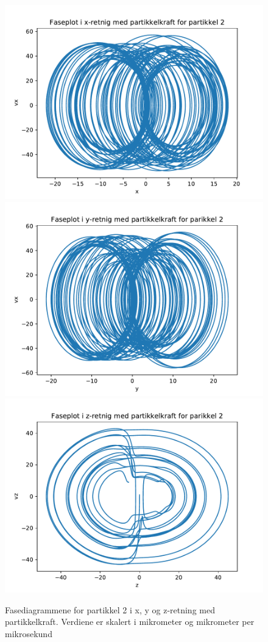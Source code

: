 \documentclass[reprint,english,notitlepage, nofootinbib]{revtex4-1}  %
\begin{document}
\begin{figure}[H]
	\centering 
	\includegraphics[scale=0.4]{../pythonplots/xint2.pdf}
	\includegraphics[scale=0.4]{../pythonplots/yint2.pdf}
	\includegraphics[scale=0.4]{../pythonplots/zint2.pdf}
	\caption{Fasediagrammene for partikkel 2 i x, y og z-retning med partikkelkraft. Verdiene er skalert i mikrometer og mikrometer per mikrosekund}
	\label{Fig:faseint2}
\end{figure}
\end{document}
